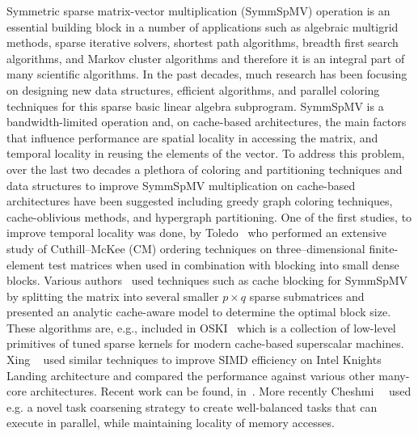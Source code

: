 Symmetric sparse matrix-vector multiplication (\acrshort{SymmSpMV})
operation  is an essential building block in a number of applications
such as algebraic multigrid methods, sparse iterative solvers,
shortest path algorithms, breadth first search algorithms, and Markov
cluster algorithms and therefore it is an integral part of many scientific algorithms.
In the past decades, much research has been
focusing on designing new data structures, efficient algorithms, and
parallel coloring techniques for this sparse basic linear algebra
subprogram.  \acrshort{SymmSpMV} is a bandwidth-limited operation and, on
cache-based architectures, the main factors that influence performance
are spatial locality in accessing the matrix, and temporal locality in
reusing the elements of the vector. To address this problem, over the
last two decades a plethora of coloring and partitioning techniques
and data structures to improve \acrshort{SymmSpMV} multiplication on cache-based
architectures have been suggested including greedy graph coloring
techniques, cache-oblivious methods, and hypergraph partitioning. One
of the first studies, \eg to improve temporal locality was done, \eg
by Toledo~\cite{Toledo:1997:IMP:279511.279532} who performed an
extensive study of Cuthill--McKee (CM) ordering
techniques on three--dimensional finite-element test matrices when
used in combination with blocking into small dense blocks. Various
authors~\cite{Buluc:2011:RMA:2058524.2059503,Williams:2009:OSM:1513001.1513318,doi:10.1177/1094342004041296}
used techniques such as cache blocking for  \acrshort{SymmSpMV} by splitting the matrix into several smaller $p \times
q$ sparse submatrices and presented an analytic cache-aware model to
determine the optimal block size. These algorithms are, e.g.,
included in OSKI~\cite{1742-6596-16-1-071} which is a collection of
low-level primitives of tuned sparse kernels for modern cache-based
superscalar machines. Xing \etal~\cite{Liu:2013:ESM:2464996.2465013}
used similar techniques to improve SIMD efficiency on Intel Knights
Landing architecture and compared the performance against various other
many-core architectures. Recent work
can be found, \eg
in~\cite{Buluc:2011:RMA:2058524.2059503,li2017hbm,Liu:2015:CES:2751205.2751209,liu2015spmv}.
More recently Cheshmi~\etal~\cite{Cheshmi:2018:PIT:3291656.3291739} used e.g. a
novel task coarsening strategy to create well-balanced tasks that can
execute in parallel, while maintaining locality of memory accesses. 



